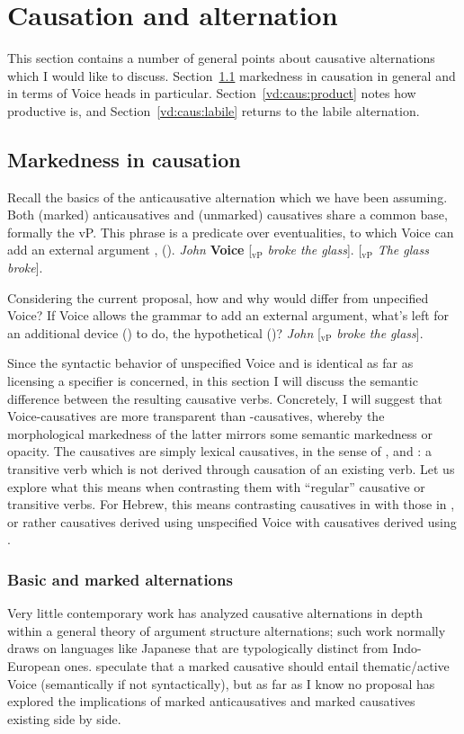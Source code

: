 \section{Causation and alternation} \label{vd:caus}
This section contains a number of general points about causative alternations which I would like to discuss. Section~\ref{vd:caus:marked} markedness in causation in general and in terms of Voice heads in particular. Section~\ref{vd:caus:product} notes how productive {\vd} is, and Section~\ref{vd:caus:labile} returns to the labile alternation.

	\subsection{Markedness in causation} \label{vd:caus:marked}
Recall the basics of the anticausative alternation which we have been assuming. Both (marked) anticausatives and (unmarked) causatives share a common base, formally the vP. This phrase is a predicate over eventualities, to which Voice can add an external argument \citep{schaefer08,layering15}, (\nextx).
\pex 
	\a \emph{John} \textbf{Voice} [$_{\text{vP}}$ \emph{broke the glass}].
	\a {\zero} \textbf{\vz} [$_{\text{vP}}$ \emph{The glass broke}].
\xe

Considering the current proposal, how and why would {\vd} differ from unpecified Voice? If Voice allows the grammar to add an external argument, what's left for an additional device (\vd) to do, the hypothetical (\nextx)?
\ex \emph{John} \textbf{\vd} [$_{\text{vP}}$ \emph{broke the glass}].
\xe

Since the syntactic behavior of unspecified Voice and {\vd} is identical as far as licensing a specifier is concerned, in this section I will discuss the semantic difference between the resulting causative verbs. Concretely, I will suggest that Voice-causatives are more transparent than {\vd}-causatives, whereby the morphological markedness of the latter mirrors some semantic markedness or opacity. The {\vd} causatives are simply lexical causatives, in the sense of \cite{fodor70}, \cite{miyagawa98} and \cite{harley08}: a transitive verb which is not derived through causation of an existing verb. Let us explore what this means when contrasting them with ``regular'' causative or transitive verbs. For Hebrew, this means contrasting causatives in {\tkal} with those in {\thif}, or rather causatives derived using unspecified Voice with causatives derived using {\vd}.

		\subsubsection{Basic and marked alternations}
Very little contemporary work has analyzed causative alternations in depth within a general theory of argument structure alternations; such work normally draws on languages like Japanese \citep{jacobsen92} that are typologically distinct from Indo-European ones. \citet[62ff]{layering15} speculate that a marked causative should entail thematic/active Voice (semantically if not syntactically), but as far as I know no proposal has explored the implications of marked anticausatives and marked causatives existing side by side.

